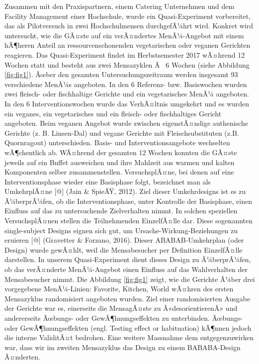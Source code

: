 \documentclass[12pt,ngerman,]{article}
\begin{document}
Zusammen mit den Praxispartnern, einem Catering Unternehmen und dem
Facility Management einer Hochschule, wurde ein Quasi-Experiment
vorbereitet, das als Pilotversuch in zwei Hochschulmensen durchgefÃ¼hrt
wird. Konkret wird untersucht, wie die GÃ¤ste auf ein verÃ¤ndertes
MenÃ¼-Angebot mit einem hÃ¶heren Anteil an ressourcenschonenden
vegetarischen oder veganen Gerichten reagieren. Das Quasi-Experiment
findet im Herbstsemester 2017 wÃ¤hrend 12 Wochen statt und besteht aus
zwei Mensazyklen Ã~ 6 Wochen (siehe Abbildung \ref{fig:fig1}). Ãœber den
gesamten Untersuchungszeitraum werden insgesamt 93 verschiedene MenÃ¼s
angeboten. In den 6 Referenz- bzw. Basiswochen wurden zwei fleisch- oder
fischhaltige Gerichte und ein vegetarisches MenÃ¼ angeboten. In den 6
Interventionswochen wurde das VerhÃ¤ltnis umgekehrt und es wurden ein
veganes, ein vegetarisches und ein fleisch- oder fischhaltiges Gericht
angeboten. Beim veganen Angebot wurde zwischen eigenstÃ¤ndige
authenische Gerichte (z. B. Linsen-Dal) und vegane Gerichte mit
Fleischsubstituten (z.B. Quornragout) unterschieden. Basis- und
Interventionsangebote wechselten wÃ¶chentlich ab. WÃ¤hrend der gesamten
12 Wochen konnten die GÃ¤ste jeweils auf ein Buffet ausweichen und ihre
Mahlzeit aus warmen und kalten Komponenten selber zusammenstellen.
VersuchsplÃ¤ne, bei denen auf eine Interventionsphase wieder eine
Basisphase folgt, bezeichnet man als UmkehrplÃ¤ne {[}@{]} (Jain \&
SpieÃŸ, 2012). Ziel dieser Umkehrdesigns ist es zu Ã¼berprÃ¼fen, ob die
Interventionsphase, unter Kontrolle der Basisphase, einen Einfluss auf
das zu untersuchende Zielverhalten nimmt. In solchen speziellen
VersuchsplÃ¤nen stellen die Teilnehmenden EinzelfÃ¤lle dar. Diese
sogenannten single-subject Designs eignen sich gut, um
Ursache-Wirkung-Beziehungen zu eruieren {[}@{]} (Gravetter \& Forzano,
2016). Dieser ABABAB-Umkehrplan (oder Design) wurde gewÃ¤hlt, weil die
Mensabesucher per Definition EinzelfÃ¤lle darstellen. In unserem
Quasi-Experiment dient dieses Design zu Ã¼berprÃ¼fen, ob das verÃ¤nderte
MenÃ¼-Angebot einen Einfluss auf das Wahlverhalten der Mensabesucher
nimmt. Die Abbildung \ref{fig:fig1} zeigt, wie die Gerichte Ã¼ber drei
vorgegebene MenÃ¼-Linien: Favorite, Kitchen, World wÃ¤hren des ersten
Mensazyklus randomisiert angeboten wurden. Ziel einer randomisierten
Ausgabe der Gerichte war es, einerseits die MensagÃ¤ste zu
Â«desorientierenÂ» und andererseits Ãœbungs- oder GewÃ¶hnungseffekten zu
unterbinden. Ãœbungs- oder GewÃ¶hnungseffekten (engl. Testing effect or
habituation) kÃ¶nnen jedoch die interne ValiditÃ¤t bedrohen. Eine
weitere Massnahme dem entgegenzuwirken war, dass wir im zweiten
Mensazyklus das Design zu einem BABABA-Design Ã¤nderten.
\end{document}

